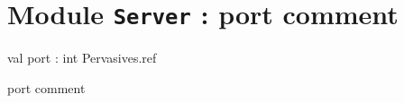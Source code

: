 \documentclass[11pt]{article}
\begin{document}
\tableofcontents
\section{Module {\tt{Server}} : port comment}
\label{module:Server}




\ocamldocvspace{0.5cm}



\label{val:Server.port}\begin{ocamldoccode}
val port : int Pervasives.ref
\end{ocamldoccode}
\begin{ocamldocdescription}
port comment


\end{ocamldocdescription}
\end{document}
